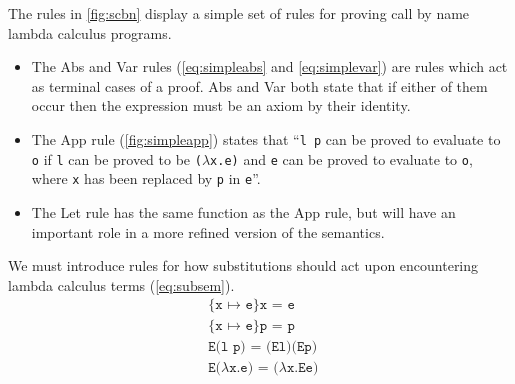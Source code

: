 The rules in \autoref{fig:scbn} display a simple set of rules for proving call by name lambda calculus programs.
\begin{itemize}
	\item The Abs and Var rules (\autoref{eq:simpleabs} and \autoref{eq:simplevar}) are rules which act as terminal cases of a proof.
	      Abs and Var both state that if either of them occur then the expression must be an axiom by their identity.
	\item The App rule (\autoref{fig:simpleapp}) states that ``\texttt{l p} can be proved to evaluate to \texttt{o} if \texttt{l} can be proved to be \texttt{($\lambda$x.e)} and \texttt{e} can be proved to evaluate to \texttt{o}, where \texttt{x} has been replaced by \texttt{p} in \texttt{e}''.
	\item The Let rule has the same function as the App rule, but will have an important role in a more refined version of the semantics.
\end{itemize}
We must introduce rules for how substitutions should act upon encountering lambda calculus terms (\autoref{eq:subsem}).
\begin{align}
	 & \texttt{\{x $\mapsto$ e\}x = e} \label{eq:subsem}                \\
	 & \texttt{\{x $\mapsto$ e\}p = p}  \tag*{}                         \\
	 & \texttt{E(l p) = (El)(Ep)} \tag*{}                               \\
	 & \texttt{E($\lambda$x.e) = ($\lambda$x.Ee) } \label{eq:subsemrem} %
\end{align}


